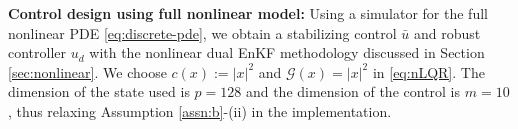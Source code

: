 \documentclass[letterpaper, 10 pt, conference]{ieeeconf}  %
\newcommand{\todo}[1]{{\color{blue} #1}}
\begin{document}






\noindent \textbf{Control design using full nonlinear model:}
Using a simulator for the full nonlinear PDE \eqref{eq:discrete-pde}, we obtain a stabilizing control $\bar{u}$ and robust controller $u_d$ with the nonlinear dual EnKF methodology discussed in Section \ref{sec:nonlinear}. We choose $c(x) := |x|^2$ and $\mathcal{G}(x) = |x|^2$ in \eqref{eq:nLQR}. 
The dimension of the state used is $p=128$ and the dimension of the control is $m=10$, thus relaxing Assumption \ref{assn:b}-(ii) in the implementation. 
\end{document}
